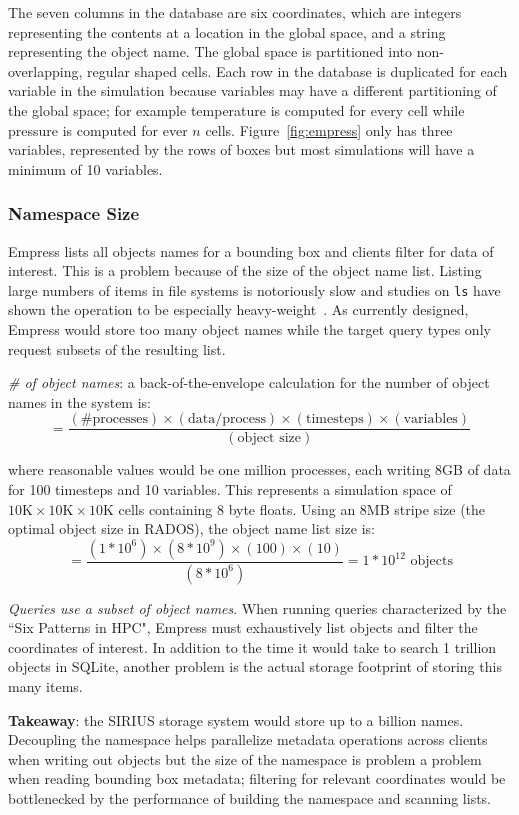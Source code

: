 The seven columns in the database are six coordinates, which are integers
representing the contents at a location in the global space, and a string
representing the object name. The global space is partitioned into
non-overlapping, regular shaped cells.  Each row in the database is duplicated
for each variable in the simulation because variables may have a different
partitioning of the global space; for example temperature is computed for every
cell while pressure is computed for ever \(n\) cells.  Figure~\ref{fig:empress}
only has three variables, represented by the rows of boxes but most simulations
will have a minimum of 10 variables.

\subsubsection{Namespace Size}

Empress lists all objects names for a bounding box and clients filter for data
of interest. This is a problem because of the size of the object name list.
Listing large numbers of items in file systems is notoriously slow and studies
on \texttt{ls} have shown the operation to be especially
heavy-weight~\cite{carns:ipdps09-pvfs, eshel:fast10-panache}.  As currently
designed, Empress would store too many object names while the target query
types only request subsets of the resulting list.

\emph{\# of object names}: a back-of-the-envelope calculation for the number of
object names in the system is:
\[=\frac
  {(\text{\# processes})\times
   (\text{data/process})\times
   (\text{timesteps})\times
   (\text{variables})}
  {(\text{object size})}
\]

where reasonable values would be one million processes, each writing 8GB of
data for 100 timesteps and 10 variables. This represents a simulation space of
\(10\text{K}\times10\text{K}\times10\text{K}\) cells containing 8 byte floats.
Using an 8MB stripe size (the optimal object size in RADOS), the object name
list size is: \[=\frac{(1*10^6)\times(8*10^{9})\times(100)\times(10)}{(8*10^6)}
= 1*10^{12} \text{ objects} \]

\emph{Queries use a subset of object names}. When running queries characterized
by the ``Six Patterns in HPC", Empress must exhaustively list objects and
filter the coordinates of interest.  In addition to the time it would take to
search 1 trillion objects in SQLite, another problem is the actual storage
footprint of storing this many items.

\noindent\textbf{Takeaway}: the SIRIUS storage system would store up to a
billion names. Decoupling the namespace helps parallelize metadata operations
across clients when writing out objects but the size of the namespace is
problem a problem when reading bounding box metadata; filtering for relevant
coordinates would be bottlenecked by the performance of building the namespace
and scanning lists.
